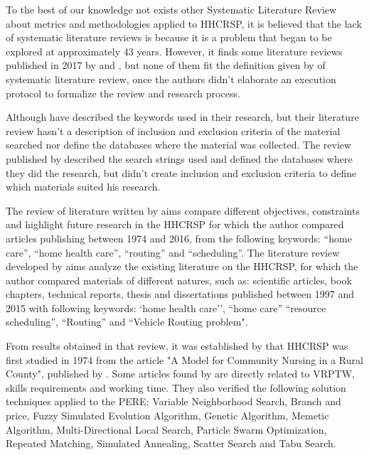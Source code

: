 To the best of our knowledge not exists other Systematic Literature Review about metrics and methodologies applied to \ac{HHCRSP}, it is believed that the lack of systematic literature reviews is because it is a problem that began to be explored at approximately 43 years. However, it finds some literature reviews published in 2017 by  and , but none of them fit the definition given by  of systematic literature review, once the authors didn't elaborate an execution protocol to formalize the review and research process.

Although  have described the keywords used in their research, but their literature review hasn't a description of inclusion and exclusion criteria of the material searched nor define the databases where the material was collected. The review published by   described the search strings used and defined the databases where they did the research, but didn't create inclusion and exclusion criteria to define which materials suited his research.

The review of literature written by  aims compare different objectives, constraints and highlight future research in the \ac{HHCRSP} for which the author compared articles publishing between 1974 and 2016, from the following keywords: ``home care'', ``home health care'', ``routing'' and ``scheduling''.
The literature review developed by  aims  analyze the existing literature on the \ac{HHCRSP}, for which the author compared materials of different natures, such as: scientific articles, book chapters, technical reports, thesis and dissertations published between 1997 and 2015 with following keywords: `home health care'', ``home care'' ``resource  scheduling'',  ``Routing'' and ``Vehicle Routing problem".

From results obtained in that review, it was established by  that \ac{HHCRSP} was first studied in 1974 from the article "A Model for Community Nursing in a Rural County", published by . 
Some articles found by  are directly related to \ac{VRPTW}, skills requirements and working time. 
They also verified the following solution techniques applied to the PERE: Variable Neighborhood Search, Branch and price, Fuzzy Simulated Evolution Algorithm, Genetic Algorithm, Memetic Algorithm, Multi-Directional Local Search, Particle Swarm Optimization, Repeated Matching, Simulated Annealing, Scatter Search and Tabu Search.

